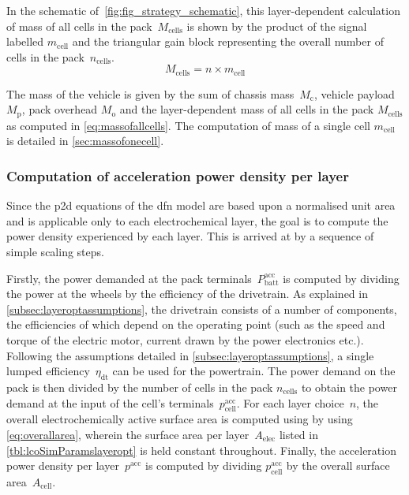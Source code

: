 In  the  schematic  of~\cref{fig:fig_strategy_schematic},  this  layer-dependent
calculation of  mass of all cells  in the pack~$M_\text{cells}$ is  shown by the
product of  the signal  labelled $m_\text{cell}$ and  the triangular  gain block
representing the overall number of cells in the pack~$n_\text{cells}$.
\begin{equation}\label{eq:massofallcells}
    M_\text{cells} = n \times m_\text{cell}
\end{equation}

The  mass of  the vehicle  is  given by  the sum  of chassis  mass~$M_\text{c}$,
vehicle payload $M_\text{p}$, pack overhead $M_\text{o}$ and the layer-dependent
mass   of   all   cells   in   the  pack   $M_\text{cells}$   as   computed   in
\cref{eq:massofallcells}.   The   computation  of   mass   of   a  single   cell
$m_\text{cell}$ is detailed in \cref{sec:massofonecell}.

\subsubsection*{Computation of acceleration power density per layer}

Since the \gls{p2d} equations of the \gls{dfn} model are based upon a normalised
unit area and is  applicable only to each electrochemical layer,  the goal is to
compute the  power density experienced  by each layer. This  is arrived at  by a
sequence of simple scaling steps.

Firstly, the power demanded  at the pack terminals~$P^\text{acc}_\text{batt}$ is
computed  by  dividing  the  power  at  the wheels  by  the  efficiency  of  the
drivetrain.  As explained  in \cref{subsec:layeroptassumptions},  the drivetrain
consists of  a number  of components,  the efficiencies of  which depend  on the
operating point  (such as the  speed and torque  of the electric  motor, current
drawn  by the  power electronics  etc.). Following  the assumptions  detailed in
\cref{subsec:layeroptassumptions},  a single  lumped efficiency~$\eta_\text{dt}$
can be  used for the powertrain.  The power demand  on the pack is  then divided
by  the  number of  cells  in  the pack  $n_\text{cells}$  to  obtain the  power
demand  at the  input  of the  cell's terminals~$p^\text{acc}_\text{cell}$.  For
each  layer choice~$n$,  the overall  electrochemically active  surface area  is
computed  using by  using \cref{eq:overallarea},  wherein the  surface area  per
layer~$A_\text{elec}$ listed in \cref{tbl:lcoSimParamslayeropt} is held constant
throughout.  Finally, the  acceleration power  density per  layer~$p^\text{acc}$
is  computed  by  dividing  $p^\text{acc}_\text{cell}$ by  the  overall  surface
area~$A_\text{cell}$.

